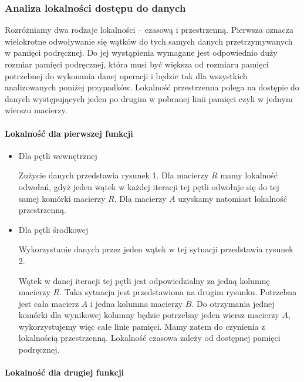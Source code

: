 \documentclass{article}
\begin{document}
\subsubsection{Analiza lokalności dostępu do danych}

Rozróżniamy dwa rodzaje lokalności -- czasową i przestrzenną. Pierwsza oznacza wielokrotne odwoływanie się wątków do tych samych danych przetrzymywanych w pamięci podręcznej. Do jej wystąpienia wymagane jest odpowiednio duży rozmiar pamięci podręcznej, która musi być większa od rozmiaru pamięci potrzebnej do wykonania danej operacji i będzie tak dla wszystkich analizowanych poniżej przypadków. Lokalność przestrzenna polega na dostępie do danych występujących jeden po drugim w pobranej linii pamięci czyli w jednym wierszu macierzy.

\paragraph{Lokalność dla pierwszej funkcji}

\begin{itemize}

\item Dla pętli wewnętrznej

Zużycie danych przedstawia rysunek 1. Dla macierzy $R$ mamy lokalność odwołań, gdyż jeden wątek w każdej iteracji tej pętli odwołuje się do tej samej komórki macierzy $R$. Dla macierzy $A$ uzyskamy natomiast lokalność przestrzenną.

\item Dla pętli środkowej

Wykorzystanie danych przez jeden wątek w tej sytuacji przedstawia rysunek 2. 

Wątek w danej iteracji tej pętli jest odpowiedzialny za jedną kolumnę macierzy $R$. Taka sytuacja jest przedstawiona na drugim rysunku. Potrzebna jest cała macierz $A$ i jedna kolumna macierzy $B$. Do otrzymania jednej komórki dla wynikowej kolumny będzie potrzebny jeden wiersz macierzy $A$, wykorzystujemy więc całe linie pamięci. Mamy zatem do czynienia z lokalnością przestrzenną. Lokalność czasowa zależy od dostępnej pamięci podręcznej.

\end{itemize}

\paragraph{Lokalność dla drugiej funkcji}
\end{document}
